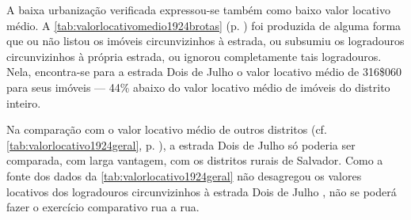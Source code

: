 
A baixa urbanização verificada expressou-se também como baixo valor locativo médio. A \autoref{tab:valorlocativomedio1924brotas} (p. \pageref{tab:valorlocativomedio1924brotas}) foi produzida de alguma forma que ou não listou os imóveis circunvizinhos à estrada, ou subsumiu os logradouros circunvizinhos à própria estrada, ou ignorou completamente tais logradouros. Nela, encontra-se para a estrada Dois de Julho o valor locativo médio de 316\$060 para seus imóveis --- 44\% abaixo do valor locativo médio de imóveis do distrito inteiro.

Na comparação com o valor locativo médio de outros distritos (cf. \autoref{tab:valorlocativo1924geral}, p. \pageref{tab:valorlocativo1924geral}), a estrada Dois de Julho só poderia ser comparada, com larga vantagem, com os distritos rurais de Salvador. Como a fonte dos dados da \autoref{tab:valorlocativo1924geral} não desagregou os valores locativos dos logradouros circunvizinhos à estrada Dois de Julho \cite{bahia_annuario_1926}, não se poderá fazer o exercício comparativo rua a rua.








